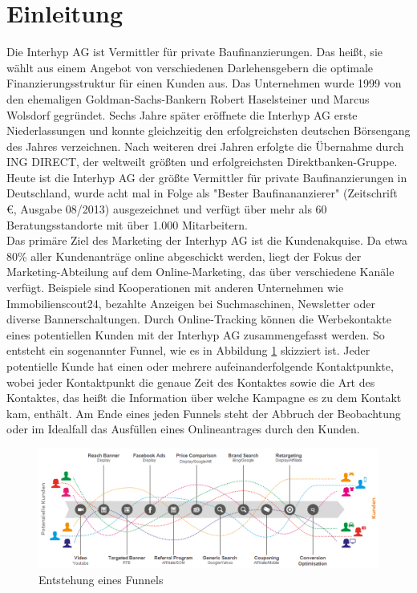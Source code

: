 \section{Einleitung}

Die Interhyp AG ist Vermittler für private Baufinanzierungen. Das heißt, sie wählt aus einem Angebot von verschiedenen Darlehensgebern die optimale Finanzierungsstruktur für einen Kunden aus. Das Unternehmen wurde 1999 von den ehemaligen Goldman-Sachs-Bankern Robert Haselsteiner und Marcus Wolsdorf gegründet. Sechs Jahre später eröffnete die Interhyp AG erste Niederlassungen und konnte gleichzeitig den erfolgreichsten deutschen Börsengang des Jahres verzeichnen. Nach weiteren drei Jahren erfolgte die Übernahme durch ING DIRECT, der weltweilt größten und erfolgreichsten Direktbanken-Gruppe. Heute ist die Interhyp AG der größte Vermittler für private Baufinanzierungen in Deutschland, wurde acht mal in Folge als "Bester Baufinananzierer" (Zeitschrift \euro, Ausgabe 08/2013) ausgezeichnet und verfügt über mehr als 60 Beratungsstandorte mit über 1.000 Mitarbeitern.\\
Das primäre Ziel des Marketing der Interhyp AG ist die Kundenakquise. Da etwa 80\% aller Kundenanträge online abgeschickt werden, liegt der Fokus der Marketing-Abteilung auf dem Online-Marketing, das über verschiedene Kanäle verfügt. Beispiele sind Kooperationen mit anderen Unternehmen wie Immobilienscout24, bezahlte Anzeigen bei Suchmaschinen, Newsletter oder diverse Bannerschaltungen. Durch Online-Tracking können die Werbekontakte eines potentiellen Kunden mit der Interhyp AG zusammengefasst werden. So entsteht ein sogenannter Funnel, wie es in Abbildung \ref{customerJourney} skizziert ist. Jeder potentielle Kunde hat einen oder mehrere aufeinanderfolgende Kontaktpunkte, wobei jeder Kontaktpunkt die genaue Zeit des Kontaktes sowie die Art des Kontaktes, das heißt die Information über welche Kampagne es zu dem Kontakt kam, enthält. Am Ende eines jeden Funnels steht der Abbruch der Beobachtung oder im Idealfall das Ausfüllen eines Onlineantrages durch den Kunden.
\begin{figure}[H]
    \centering\includegraphics[scale=0.5]{customerJourney.png}\caption{Entstehung eines Funnels}\label{customerJourney}
\end{figure}

